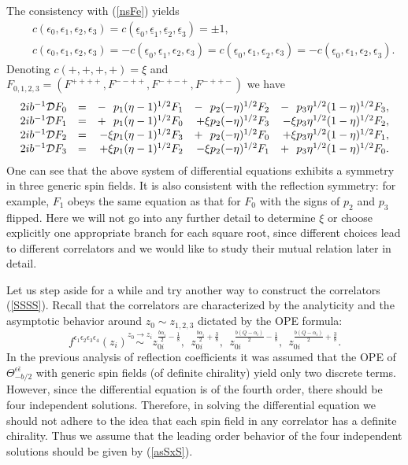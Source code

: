 \documentclass[a4paper,12pt]{article}
\newcommand{\ep}{{\epsilon}}
\newcommand{\bep}{{\bar{\epsilon}}}
\newcommand{\mep}{{\underline{\epsilon}}}
\begin{document}
 The consistency with (\ref{nsFe}) yields
\begin{eqnarray}
&&  c(\ep_0,\ep_1,\ep_2,\ep_3)=c(\mep_0,\mep_1,\mep_2,\mep_3)=\pm 1,~~~
\nonumber \\&&
  c(\ep_0,\ep_1,\ep_2,\ep_3)
 =-c(\mep_0,\mep_1,\ep_2,\ep_3)
 =c(\mep_0,\ep_1,\mep_2,\ep_3)
 =-c(\mep_0,\ep_1,\ep_2,\mep_3).
\end{eqnarray}
 Denoting $c(+,+,+,+)=\xi$
 and $F_{0,1,2,3}=(F^{++++},F^{--++},F^{-+-+},F^{-++-})$ we have
\begin{equation}
\begin{array}{rrrrr}
  2ib^{-1}{\cal D}F_0&=&
 - ~~p_1(\eta-1)^{1/2}F_1&
 - ~~p_2(-\eta)^{1/2}F_2&
 - ~~p_3\eta^{1/2}(1-\eta)^{1/2}F_3,\\
  2ib^{-1}{\cal D}F_1&=&
 + ~~p_1(\eta-1)^{1/2}F_0&
 + \xi p_2(-\eta)^{1/2}F_3&
 - \xi p_3\eta^{1/2}(1-\eta)^{1/2}F_2,\\
  2ib^{-1}{\cal D}F_2&=&
 - \xi p_1(\eta-1)^{1/2}F_3&
 +~~ p_2(-\eta)^{1/2}F_0&
 + \xi p_3\eta^{1/2}(1-\eta)^{1/2}F_1,\\
  2ib^{-1}{\cal D}F_3&=&
 + \xi p_1(\eta-1)^{1/2}F_2&
 - \xi p_2(-\eta)^{1/2}F_1&
 + ~~p_3\eta^{1/2}(1-\eta)^{1/2}F_0.
\end{array}
\label{nsFi}
\end{equation}
 One can see that the above system of differential equations
 exhibits a symmetry in three generic spin fields.
 It is also consistent with the reflection symmetry: for example,
 $F_1$ obeys the same equation as that for $F_0$ with the signs
 of $p_2$ and $p_3$ flipped.
 Here we will not go into any further detail to determine
 $\xi$ or choose explicitly one appropriate
 branch for each square root, since different choices lead to
 different correlators and we would like to study their mutual relation
 later in detail.

   Let us step aside for a while and try another way to
 construct the correlators (\ref{SSSS}).
 Recall that the correlators are characterized by the analyticity
 and the asymptotic behavior around $z_0\sim z_{1,2,3}$ dictated
 by the OPE formula:
\begin{equation}
  f^{\ep_1\ep_2\ep_3\ep_4}(z_i) \stackrel{z_0\rightarrow z_i}{\sim}
  z_{0i}^{\frac{b\alpha_i}{2}-\frac{1}{8}},~~
  z_{0i}^{\frac{b\alpha_i}{2}+\frac{3}{8}},~~
  z_{0i}^{\frac{b(Q-\alpha_i)}{2}-\frac{1}{8}},~~
  z_{0i}^{\frac{b(Q-\alpha_i)}{2}+\frac{3}{8}}.
\label{asSxS}
\end{equation}
 In the previous analysis of reflection coefficients it was assumed
 that the OPE of $\Theta_{-b/2}^{\ep\bep}$ with generic spin fields
 (of definite chirality) yield only two discrete terms.
 However, since the differential equation is of the fourth order,
 there should be four independent solutions.
 Therefore, in solving the differential equation
 we should not adhere to the idea that each spin field
 in any correlator has a definite chirality.
 Thus we assume that the leading order behavior of the four independent
 solutions should be given by (\ref{asSxS}).
\end{document}
